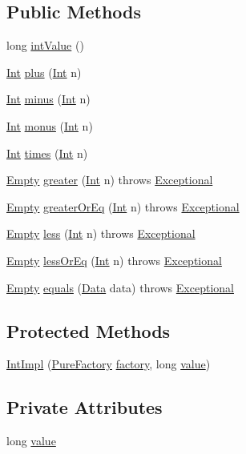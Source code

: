 \subsection*{Public Methods}
\begin{CompactItemize}
\item 
long \hyperlink{classIntImpl_a0}{int\-Value} ()
\item 
\hyperlink{interfaceInt}{Int} \hyperlink{classIntImpl_a1}{plus} (\hyperlink{interfaceInt}{Int} n)
\item 
\hyperlink{interfaceInt}{Int} \hyperlink{classIntImpl_a2}{minus} (\hyperlink{interfaceInt}{Int} n)
\item 
\hyperlink{interfaceInt}{Int} \hyperlink{classIntImpl_a3}{monus} (\hyperlink{interfaceInt}{Int} n)
\item 
\hyperlink{interfaceInt}{Int} \hyperlink{classIntImpl_a4}{times} (\hyperlink{interfaceInt}{Int} n)
\item 
\hyperlink{interfaceEmpty}{Empty} \hyperlink{classIntImpl_a5}{greater} (\hyperlink{interfaceInt}{Int} n) throws \hyperlink{classExceptional}{Exceptional}
\item 
\hyperlink{interfaceEmpty}{Empty} \hyperlink{classIntImpl_a6}{greater\-Or\-Eq} (\hyperlink{interfaceInt}{Int} n) throws \hyperlink{classExceptional}{Exceptional}
\item 
\hyperlink{interfaceEmpty}{Empty} \hyperlink{classIntImpl_a7}{less} (\hyperlink{interfaceInt}{Int} n) throws \hyperlink{classExceptional}{Exceptional}
\item 
\hyperlink{interfaceEmpty}{Empty} \hyperlink{classIntImpl_a8}{less\-Or\-Eq} (\hyperlink{interfaceInt}{Int} n) throws \hyperlink{classExceptional}{Exceptional}
\item 
\hyperlink{interfaceEmpty}{Empty} \hyperlink{classIntImpl_a9}{equals} (\hyperlink{interfaceData}{Data} data) throws \hyperlink{classExceptional}{Exceptional}
\end{CompactItemize}
\subsection*{Protected Methods}
\begin{CompactItemize}
\item 
\hyperlink{classIntImpl_b0}{Int\-Impl} (\hyperlink{classPureFactory}{Pure\-Factory} \hyperlink{classDataImpl_o0}{factory}, long \hyperlink{classIntImpl_o0}{value})
\end{CompactItemize}
\subsection*{Private Attributes}
\begin{CompactItemize}
\item 
long \hyperlink{classIntImpl_o0}{value}
\end{CompactItemize}


